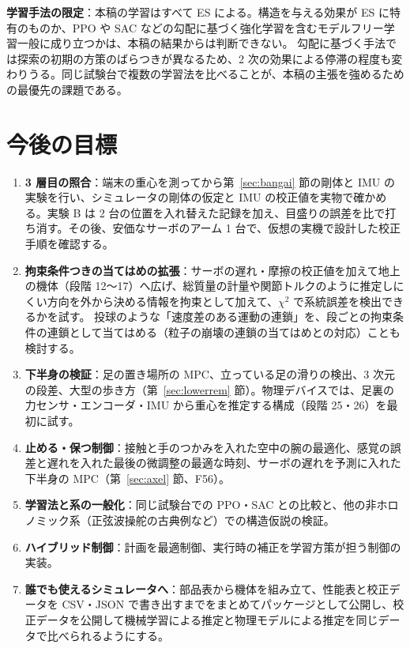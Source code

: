 \documentclass[paper=a4paper,fontsize=10pt,twocolumn,column_gap=2zw,line_length=24zw,number_of_lines=46,head_space=20mm]{jlreq}
\begin{document}
\textbf{学習手法の限定}：本稿の学習はすべて ES による。構造を与える効果が ES に特有のものか、PPO や SAC などの勾配に基づく強化学習を含むモデルフリー学習一般に成り立つかは、本稿の結果からは判断できない。
勾配に基づく手法では探索の初期の方策のばらつきが異なるため、2 次の効果による停滞の程度も変わりうる。同じ試験台で複数の学習法を比べることが、本稿の主張を強めるための最優先の課題である。


\section{今後の目標}

\begin{enumerate}\setlength{\itemsep}{0pt}
\item \textbf{3 層目の照合}：端末の重心を測ってから第~\ref{sec:bangai} 節の剛体と IMU の実験を行い、シミュレータの剛体の仮定と IMU の校正値を実物で確かめる。実験 B は 2 台の位置を入れ替えた記録を加え、目盛りの誤差を比で打ち消す。その後、安価なサーボのアーム 1 台で、仮想の実機で設計した校正手順を確認する。
\item \textbf{拘束条件つきの当てはめの拡張}：サーボの遅れ・摩擦の校正値を加えて地上の機体（段階 12〜17）へ広げ、総質量の計量や関節トルクのように推定しにくい方向を外から決める情報を拘束として加えて、$\chi^2$ で系統誤差を検出できるかを試す。
投球のような「速度差のある運動の連鎖」を、段ごとの拘束条件の連鎖として当てはめる（粒子の崩壊の連鎖の当てはめとの対応）ことも検討する。
\item \textbf{下半身の検証}：足の置き場所の MPC、立っている足の滑りの検出、3 次元の段差、大型の歩き方（第~\ref{sec:lowerrem} 節）。物理デバイスでは、足裏の力センサ・エンコーダ・IMU から重心を推定する構成（段階 25・26）を最初に試す。
\item \textbf{止める・保つ制御}：接触と手のつかみを入れた空中の腕の最適化、感覚の誤差と遅れを入れた最後の微調整の最適な時刻、サーボの遅れを予測に入れた下半身の MPC（第~\ref{sec:axel} 節、F56）。
\item \textbf{学習法と系の一般化}：同じ試験台での PPO・SAC との比較と、他の非ホロノミック系（正弦波操舵の古典例など）での構造仮説の検証。
\item \textbf{ハイブリッド制御}：計画を最適制御、実行時の補正を学習方策が担う制御の実装。
\item \textbf{誰でも使えるシミュレータへ}：部品表から機体を組み立て、性能表と校正データを CSV・JSON で書き出すまでをまとめてパッケージとして公開し、校正データを公開して機械学習による推定と物理モデルによる推定を同じデータで比べられるようにする。
\end{enumerate}
\end{document}
